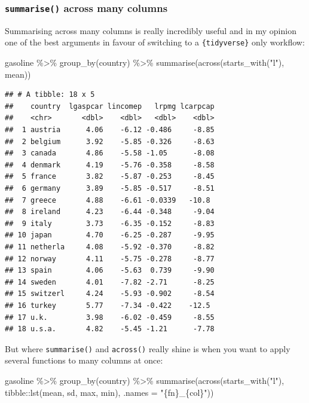 \documentclass[
]{article}
\newenvironment{Shaded}{\begin{snugshade}}{\end{snugshade}}
\newcommand{\AttributeTok}[1]{\textcolor[rgb]{0.77,0.63,0.00}{#1}}
\newcommand{\FunctionTok}[1]{\textcolor[rgb]{0.00,0.00,0.00}{#1}}
\newcommand{\NormalTok}[1]{#1}
\newcommand{\SpecialCharTok}[1]{\textcolor[rgb]{0.00,0.00,0.00}{#1}}
\newcommand{\StringTok}[1]{\textcolor[rgb]{0.31,0.60,0.02}{#1}}
\begin{document}
\hypertarget{summarise-across-many-columns}{%
\subsubsection{\texorpdfstring{\texttt{summarise()} across many columns}{summarise() across many columns}}\label{summarise-across-many-columns}}

Summarising across many columns is really incredibly useful and in my opinion one of the best
arguments in favour of switching to a \texttt{\{tidyverse\}} only workflow:

\begin{Shaded}
\begin{Highlighting}[]
\NormalTok{gasoline }\SpecialCharTok{\%\textgreater{}\%}
  \FunctionTok{group\_by}\NormalTok{(country) }\SpecialCharTok{\%\textgreater{}\%}
  \FunctionTok{summarise}\NormalTok{(}\FunctionTok{across}\NormalTok{(}\FunctionTok{starts\_with}\NormalTok{(}\StringTok{"l"}\NormalTok{), mean))}
\end{Highlighting}
\end{Shaded}

\begin{verbatim}
## # A tibble: 18 x 5
##    country  lgaspcar lincomep   lrpmg lcarpcap
##    <chr>       <dbl>    <dbl>   <dbl>    <dbl>
##  1 austria      4.06    -6.12 -0.486     -8.85
##  2 belgium      3.92    -5.85 -0.326     -8.63
##  3 canada       4.86    -5.58 -1.05      -8.08
##  4 denmark      4.19    -5.76 -0.358     -8.58
##  5 france       3.82    -5.87 -0.253     -8.45
##  6 germany      3.89    -5.85 -0.517     -8.51
##  7 greece       4.88    -6.61 -0.0339   -10.8 
##  8 ireland      4.23    -6.44 -0.348     -9.04
##  9 italy        3.73    -6.35 -0.152     -8.83
## 10 japan        4.70    -6.25 -0.287     -9.95
## 11 netherla     4.08    -5.92 -0.370     -8.82
## 12 norway       4.11    -5.75 -0.278     -8.77
## 13 spain        4.06    -5.63  0.739     -9.90
## 14 sweden       4.01    -7.82 -2.71      -8.25
## 15 switzerl     4.24    -5.93 -0.902     -8.54
## 16 turkey       5.77    -7.34 -0.422    -12.5 
## 17 u.k.         3.98    -6.02 -0.459     -8.55
## 18 u.s.a.       4.82    -5.45 -1.21      -7.78
\end{verbatim}

But where \texttt{summarise()} and \texttt{across()} really shine is when you want to apply several functions
to many columns at once:

\begin{Shaded}
\begin{Highlighting}[]
\NormalTok{gasoline }\SpecialCharTok{\%\textgreater{}\%}
  \FunctionTok{group\_by}\NormalTok{(country) }\SpecialCharTok{\%\textgreater{}\%}
  \FunctionTok{summarise}\NormalTok{(}\FunctionTok{across}\NormalTok{(}\FunctionTok{starts\_with}\NormalTok{(}\StringTok{"l"}\NormalTok{), tibble}\SpecialCharTok{::}\FunctionTok{lst}\NormalTok{(mean, sd, max, min), }\AttributeTok{.names =} \StringTok{"\{fn\}\_\{col\}"}\NormalTok{))}
\end{Highlighting}
\end{Shaded}
\end{document}

